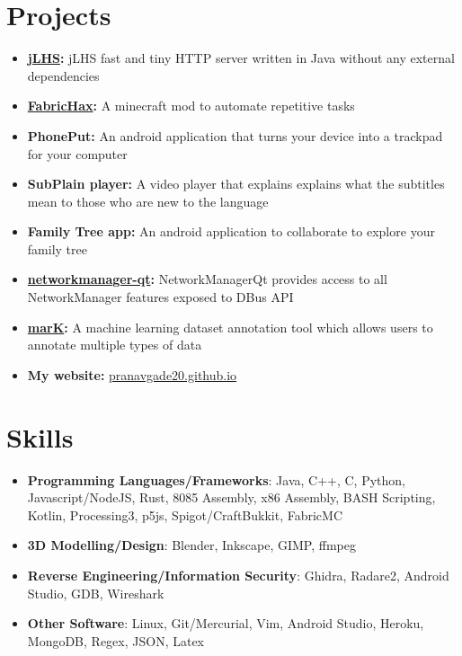 \documentclass[letterpaper,11pt]{article}
\newcommand{\orignalResumeItem}[2]{
  \item\small{
    \textbf{#1}{ #2 \vspace{-2pt}}
  }
}
\newcommand{\resumeSubItem}[2]{\orignalResumeItem{#1}{#2}\vspace{-4pt}}
\newcommand{\resumeSubHeadingListStart}{\begin{itemize}[leftmargin=*]}
\newcommand{\resumeSubHeadingListEnd}{\end{itemize}}
\begin{document}
\section{Projects}
  \resumeSubHeadingListStart
    \resumeSubItem{\href{https://github.com/pranavgade20/jLHS}{jLHS}:}
      {\vspace{-2pt}  jLHS fast and tiny HTTP server written in Java without any external dependencies}
    \resumeSubItem{\href{https://github.com/pranavgade20/FabricHax}{FabricHax}:}
	  {\vspace{-2pt}  A minecraft mod to automate repetitive tasks}
    \resumeSubItem{PhonePut:}
      {\vspace{-2pt} An android application that turns your device into a trackpad for your computer}
    \resumeSubItem{SubPlain player:}
      {\vspace{-2pt} A video player that explains explains what the subtitles mean to those who are new to the language}
    \resumeSubItem{Family Tree app:}
      {\vspace{-2pt} An android application to collaborate to explore your family tree}
    \resumeSubItem{\href{https://phabricator.kde.org/source/networkmanager-qt/}{networkmanager-qt}:}
      {\vspace{-2pt} NetworkManagerQt provides access to all NetworkManager features exposed to DBus API}
   \resumeSubItem{\href{https://invent.kde.org/education/mark}{marK}:}
      {\vspace{-2pt} A machine learning dataset annotation tool which allows users to annotate multiple types of data}
    \resumeSubItem{My website:}
      {\vspace{-2pt} \href{http://pranavgade20.github.io/}{pranavgade20.github.io}}
  \resumeSubHeadingListEnd


\section{Skills}
 \resumeSubHeadingListStart
   \item{
     \textbf{Programming Languages/Frameworks}{: Java, C++, C, Python, Javascript/NodeJS, Rust, 8085 Assembly, x86 Assembly, BASH Scripting, Kotlin, Processing3, p5js, Spigot/CraftBukkit, FabricMC}
   }
    \item{
      \vspace{-8pt}
      \textbf{3D Modelling/Design}{: Blender, Inkscape, GIMP, ffmpeg}
    }
    \item{
      \vspace{-8pt}
      \textbf{Reverse Engineering/Information Security}{: Ghidra, Radare2, Android Studio, GDB, Wireshark}
    }
    \item{
      \vspace{-8pt}
      \textbf{Other Software}{: Linux, Git/Mercurial, Vim, Android Studio, Heroku, MongoDB, Regex, JSON, Latex}
    }

 \resumeSubHeadingListEnd


\end{document}
